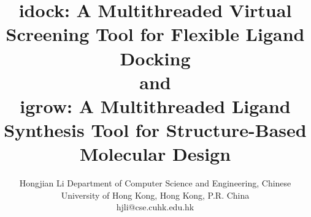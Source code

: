 \documentclass[10pt, conference, compsocconf]{../IEEEtran}
\begin{document}
\title{idock: A Multithreaded Virtual Screening Tool for Flexible Ligand Docking\\and\\igrow: A Multithreaded Ligand Synthesis Tool for Structure-Based Molecular Design} %
\author
{
\IEEEauthorblockN
{
Hongjian Li
\IEEEauthorblockA
{
Department of Computer Science and Engineering, Chinese University of Hong Kong, Hong Kong, P.R. China\\
hjli@cse.cuhk.edu.hk
}
}
}
\maketitle

\begin{abstract}


\end{abstract}
\end{document}
